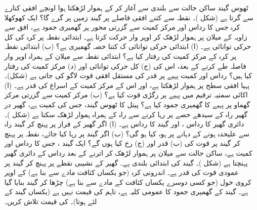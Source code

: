 ٹھوس گیند ساکن حالت سے  بلندی سے آغاز کر کے ہموار لڑھکتا ہوا  اونچے افقی  کنارے سے گرتا ہے (شکل )۔ نقطہ  سے کتنے افقی فاصلے پر گیند زمین پر گرے گا؟
ایک کھوکھلا  کرہ جس کا رداس   اور مرکز کمیت سے گزرتی محور پر گھمیری جمود  ہے،  افق  سے  زاویہ کے میلان پر  ہموار لڑھک کر اوپر وار حرکت کرتا ہے۔ ابتدائی نقطہ پر کرہ کی کل حرکی توانائی  ہے۔ (ا)  ابتدائی حرکی  توانائی ک کتنا حصہ گھمیری ہے؟ (ب) ابتدائی نقطہ پر کرہ کے مرکز کمیت کی رفتار کیا ہے؟ ابتدائی نقطہ سے  میلان کے ہمراہ اوپر وار  فاصلہ طے کرنے کے بعد، اس کی (ج) کل حرکی توانائی اور (د)  مرکز کمیت کی رفتار کیا ہیں؟
رداس  اور کمیت  پہیے پر    قدر کی مستقل افقی  قوت   لاگو کی جاتی ہے (شکل)۔ پہیا افقی سطح پر ہموار لڑھکتا ہے، اور اس کے مرکز کمیت کے اسراع  کی قدر  ہے۔ (ا)  اکائی سمتیہ ترقیم میں  پہیے پر رگڑی قوت کیا ہے؟ (ب)  مرکز کمیت سے گزرتی مرکز گھماو پر پہیے کا گھمیری جمود کیا ہے؟
پیتل کا ٹھوس  گیند، جس کی کمیت  ہے، گھیر در گھیر   راہ  کے سیدھے حصے پر رہا کرنے سے راہ کے ہمراہ ہموار لڑھک سکتا ہے (شکل )۔ دائری گھیر کا رداس  ، اور گیند کا رداس  ہے۔ (ا)  اگر  گھیر کے فراز پر پہنچ کر گیند   راہ سے علیحدہ ہونے کے دہانے پر ہو،  کیا ہو گی؟ (ب)  اگر گیند   پر رہا کیا جائے،  نقطہ  پر  پہنچ کر گیند پر قوت کی (ب) قدر  اور (ج)  رخ کیا ہوں گے؟
 ایک گیند ، جس کا رداس  اور کمیت  ہے،  ساکن حالت سے  میلان پر ہموار لڑھک کر اترنے کے بعد رداس      کے دائری گھیر  پہنچتا ہے (شکل )۔ گیند کی ابتدائی بلندی  ہے۔  گھیر کے نشیبی نقطے پر  پہنچ کر گیند پر عمودی قوت کی قدر  ہے۔  اندرونی کرہ (جو یکساں کثافت  مادے سے بنا ہے) کے اوپر  کروی خول (جو کسی دوسرے یکساں کثافت کے   مادے  سے بنا ہے) چڑھا کر گیند بنایا گیا ہے۔ گیند کے گھمیری جمود کا عمومی کلیہ  ہے، تاہم   کی قیمت  نہیں ہے (یکساں گیند کے لئے  ہوتا)۔  کی قیمت تلاش کریں۔
